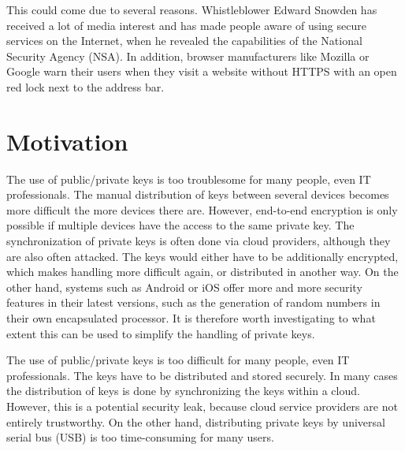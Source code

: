 \documentclass[12pt,oneside,a4paper,parskip]{scrbook}
\begin{document}
This could come due to several reasons. Whistleblower Edward Snowden has received a lot of media interest and has made people aware of using secure services on the Internet, when he revealed the capabilities of the National Security Agency (NSA). In addition, browser manufacturers like Mozilla or Google warn their users when they visit a website without HTTPS with an open red lock next to the address bar.


\section{Motivation}

The use of public/private keys is too troublesome for many people, even IT professionals. The manual distribution of keys between several devices becomes more difficult the more devices there are. However, end-to-end encryption is only possible if multiple devices have the access to the same private key. The synchronization of private keys is often done via cloud providers, although they are also often attacked. The keys would either have to be additionally encrypted, which makes handling more difficult again, or distributed in another way. On the other hand, systems such as Android or iOS offer more and more security features in their latest versions, such as the generation of random numbers in their own encapsulated processor. It is therefore worth investigating to what extent this can be used to simplify the handling of private keys.

The use of public/private keys is too difficult for many people, even IT professionals. The keys have to be distributed and stored securely. In many cases the distribution of keys is done by synchronizing the keys within a cloud. However, this is a potential security leak, because cloud service providers are not entirely trustworthy. On the other hand, distributing private keys by universal serial bus (USB) is too time-consuming for many users. 


\end{document}

